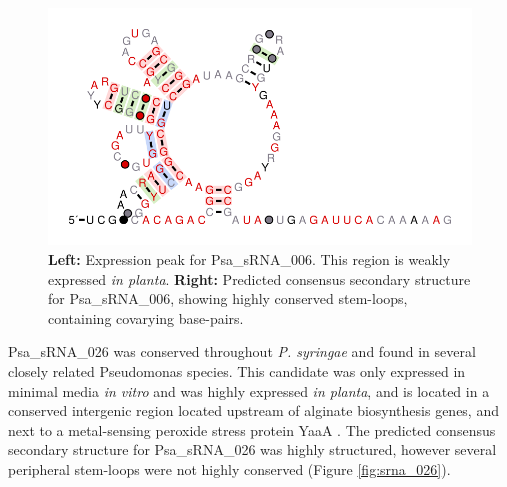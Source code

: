 \begin{figure}[H]
\begin{subfigure}{0.4\textwidth}
\end{subfigure}
\begin{minipage}{0.59\textwidth}
\includegraphics[scale=0.9]{psa/psa_ncRNA/srna_006.png}
    \caption[Expression and predicted consensus secondary structure of Psa\_sRNA\_006]{\textbf{Left:} Expression peak for Psa\_sRNA\_006. This region is weakly expressed \textit{in planta}. \textbf{Right:} Predicted consensus secondary structure for Psa\_sRNA\_006, showing highly conserved stem-loops, containing covarying base-pairs.}
    \label{fig:srna_006}
    \end{minipage}
\end{figure}

Psa\_sRNA\_026 was conserved throughout \textit{P. syringae} and found in several closely related Pseudomonas species. This candidate was only expressed in minimal media \textit{in vitro} and was highly expressed \textit{in planta}, and is located in a conserved intergenic region located upstream of alginate biosynthesis genes, and next to a metal-sensing peroxide stress protein YaaA \citep{Liu2011-rz}. The predicted consensus secondary structure for Psa\_sRNA\_026 was highly structured, however several peripheral stem-loops were not highly conserved (Figure \ref{fig:srna_026}).

